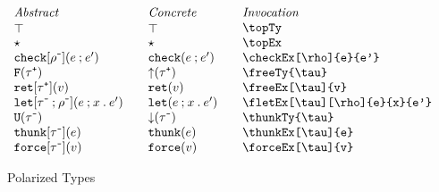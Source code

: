 \documentclass[11pt]{article}
\begin{document}
\begin{figure}

  \begin{small}
    \begin{displaymath}
      \begin{array}{l@{\qquad}l@{\qquad}l@{\qquad}l}
        \textit{Abstract} & \textit{Concrete} & \textit{Invocation} \\
        \topTy                                        & \topTy*                   & \verb|\topTy| \\
        \topEx                                        & \topEx*                   & \verb|\topEx| \\
        \checkEx[\negTy{\rho}]{e}{e'}                 & \checkEx*{e}{e'}          & \verb|\checkEx[\rho]{e}{e'}| \\
        \freeTy{\posTy{\tau}}                         & \freeTy*{\posTy{\tau}}    & \verb|\freeTy{\tau}|                         \\
        \freeEx[\posTy{\tau}]{v}                      & \freeEx*[\posTy{\tau}]{v} & \verb|\freeEx[\tau]{v}|                      \\
        \fletEx[\negTy{\tau}][\negTy{\rho}]{e}{x}{e'} & \fletEx*{e}{x}{e'}        & \verb|\fletEx[\tau][\rho]{e}{x}{e'}| \\
        \thunkTy{\negTy{\tau}}                        & \thunkTy*{\negTy{\tau}}   & \verb|\thunkTy{\tau}|                        \\
        \thunkEx[\negTy{\tau}]{e}                     & \thunkEx*{e}              & \verb|\thunkEx[\tau]{e}|                     \\
        \forceEx[\negTy{\tau}]{v}                     & \forceEx*{v}              & \verb|\forceEx[\tau]{v}|
      \end{array}
    \end{displaymath}
  \end{small}

  \caption{Polarized Types}
  \label{fig:pol}
\end{figure}
\end{document}
